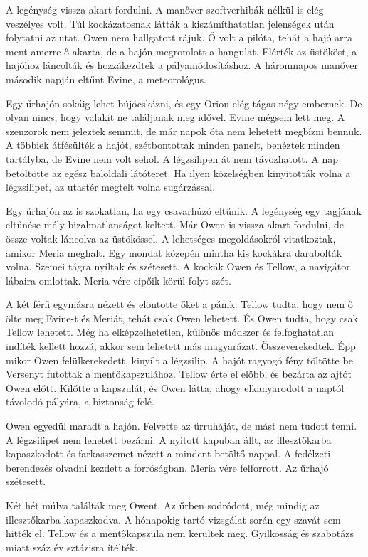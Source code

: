 \documentclass[10pt]{memoir}
\begin{document}
A legénység vissza akart fordulni. A manőver szoftverhibák nélkül is elég
veszélyes volt. Túl kockázatosnak látták a kiszámíthatatlan jelenségek után
folytatni az utat. Owen nem hallgatott rájuk. Ő volt a pilóta, tehát a hajó
arra ment amerre ő akarta, de a hajón megromlott a hangulat. Elérték az
üstököst, a hajóhoz láncolták és hozzákezdtek a pályamódosításhoz. A háromnapos
manőver második napján eltűnt Evine, a meteorológus.

Egy űrhajón sokáig lehet bújócskázni, és egy Orion elég tágas négy embernek. De
olyan nincs, hogy valakit ne találjanak meg idővel. Evine mégsem lett meg. A
szenzorok nem jeleztek semmit, de már napok óta nem lehetett megbízni bennük. A
többiek átfésülték a hajót, szétbontottak minden panelt, benéztek minden
tartályba, de Evine nem volt sehol. A légzsilipen át nem távozhatott. A nap
betöltötte az egész baloldali látóteret. Ha ilyen közelségben kinyitották volna
a légzsilipet, az utastér megtelt volna sugárzással.

Egy űrhajón az is szokatlan, ha egy csavarhúzó eltűnik. A legénység egy
tagjának eltűnése mély bizalmatlanságot keltett. Már Owen is vissza akart
fordulni, de össze voltak láncolva az üstökössel. A lehetséges megoldásokról
vitatkoztak, amikor Meria meghalt. Egy mondat közepén mintha kis kockákra
darabolták volna. Szemei tágra nyíltak és szétesett. A kockák Owen és Tellow, a
navigátor lábaira omlottak. Meria vére cipőik körül folyt szét.

A két férfi egymásra nézett és elöntötte őket a pánik. Tellow tudta, hogy nem ő
ölte meg Evine-t és Meriát, tehát csak Owen lehetett. És Owen tudta, hogy csak
Tellow lehetett. Még ha elképzelhetetlen, különös módszer és felfoghatatlan
indíték kellett hozzá, akkor sem lehetett más magyarázat. Összeverekedtek. Épp
mikor Owen felülkerekedett, kinyílt a légzsilip. A hajót ragyogó fény töltötte
be. Versenyt futottak a mentőkapszulához. Tellow érte el előbb, és bezárta az
ajtót Owen előtt. Kilőtte a kapszulát, és Owen látta, ahogy elkanyarodott a
naptól távolodó pályára, a biztonság felé.

Owen egyedül maradt a hajón. Felvette az űrruháját, de mást nem tudott tenni. A
légzsilipet nem lehetett bezárni. A nyitott kapuban állt, az illesztőkarba
kapaszkodott és farkasszemet nézett a mindent betöltő nappal. A fedélzeti
berendezés olvadni kezdett a forróságban. Meria vére felforrott. Az űrhajó
szétesett.

Két hét múlva találták meg Owent. Az űrben sodródott, még mindig az
illesztőkarba kapaszkodva. A hónapokig tartó vizsgálat során egy szavát sem
hitték el. Tellow és a mentőkapszula nem kerültek meg. Gyilkosság és szabotázs
miatt száz év sztázisra ítélték.
\end{document}
